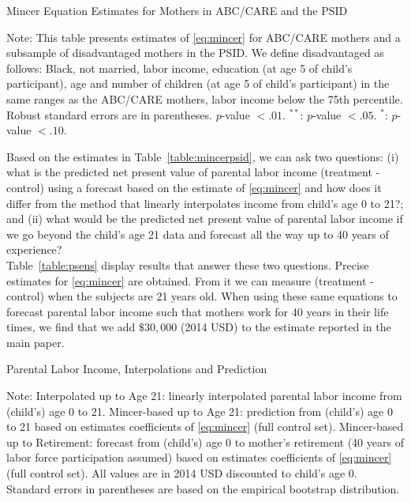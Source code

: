 \begin{table}[H]
\begin{threeparttable}
\caption{Mincer Equation Estimates for Mothers in ABC/CARE and the PSID}
\label{table:mincerpsid}
\centering
\footnotesize

\begin{tablenotes}
\footnotesize
\item Note: This table presents estimates of \eqref{eq:mincer} for ABC/CARE mothers and a subsample of disadvantaged mothers in the PSID. We define disadvantaged as follows: Black, not married, labor income, education (at age 5 of child's participant), age and number of children (at age 5 of child's participant) in the same ranges as the ABC/CARE mothers, labor income below the 75th percentile. Robust standard errors are in parentheses. $p$-value $< .01$. $^{**}$: $p$-value $< .05$. $^{*}$: $p$-value $< .10$.
\end{tablenotes}
\end{threeparttable}
\end{table}

\noindent Based on the estimates in Table~\ref{table:mincerpsid}, we can ask two questions: (i) what is the predicted net present value of parental labor income (treatment - control) using a forecast based on the estimate of \eqref{eq:mincer} and how does it differ from the method that linearly interpolates income from child's age 0 to 21?; and (ii) what would be the predicted net present value of parental labor income if we go beyond the child's age 21 data and forecast all the way up to 40 years of experience?\\

\noindent Table~\ref{table:psens} display results that answer these two questions. Precise estimates for \eqref{eq:mincer} are obtained. From it we can measure (treatment - control) when the subjects are 21 years old. When using these same equations to forecast parental labor income such that mothers work for 40 years in their life times, we find that we add $\$30,000$ (2014 USD) to the estimate reported in the main paper.

\begin{table}[H]
\begin{threeparttable}
\caption{Parental Labor Income, Interpolations and Prediction}
\label{table:psens}
\centering

\begin{tablenotes}
\footnotesize
\item Note:  Interpolated up to Age 21: linearly interpolated parental labor income from (child's) age 0 to 21. Mincer-based up to Age 21: prediction from (child's) age 0 to 21 based on estimates coefficients of \eqref{eq:mincer} (full control set). Mincer-based up to Retirement: forecast from (child's) age 0 to mother's retirement (40 years of labor force participation assumed) based on estimates coefficients of \eqref{eq:mincer} (full control set). All values are in 2014 USD discounted to child's age 0. Standard errors in parentheses are based on the empirical bootstrap distribution.
\end{tablenotes}
\end{threeparttable}
\end{table}

